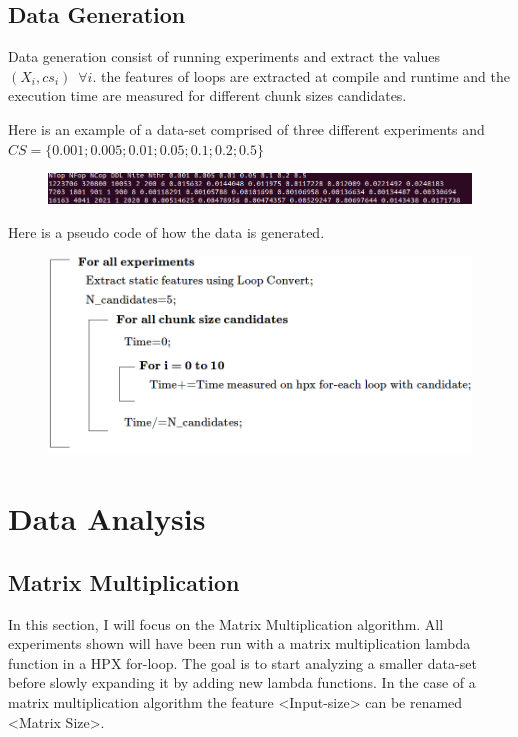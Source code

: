 \documentclass[12pt]{article}
\begin{document}
\subsection{Data Generation}
Data generation consist of running experiments and extract the values $(X_i,cs_i) \, \, \, \forall i$. the features of loops are extracted at compile and runtime and the execution time are measured for different chunk sizes candidates. 

Here is an example of a data-set comprised of three different experiments and $CS=\{0.001;0.005;0.01;0.05;0.1;0.2;0.5\}$

\begin{figure}[h]
	\centering
	\includegraphics[scale=0.45]{screenshot.png}
\end{figure}


Here is a pseudo code of how the data is generated.

\begin{figure}[h]
	\centering
	\includegraphics[scale=0.49]{pseudo-code.png}
\end{figure}
\section{Data Analysis}

\subsection{Matrix Multiplication}
In this section, I will focus on the Matrix Multiplication algorithm. All experiments shown will have been run with a matrix multiplication lambda function in a HPX for-loop. The goal is to start analyzing a smaller data-set before slowly expanding it by adding new lambda functions. In the case of a matrix multiplication algorithm the feature <Input-size> can be renamed <Matrix Size>.
\end{document}
